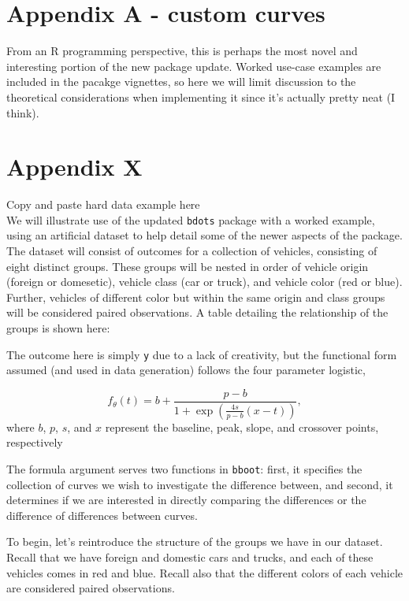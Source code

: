 \documentclass{article}
\newcommand{\xt}{\texttt}%
\begin{document}
\appendix

\section*{Appendix A - custom curves}

From an R programming perspective, this is perhaps the most novel and interesting portion of the new package update. Worked use-case examples are included in the pacakge vignettes, so here we will limit discussion to the theoretical considerations when implementing it since it's actually pretty neat (I think). 



\section*{Appendix X} Copy and paste hard data example here \\

We will illustrate use of the updated \xt{bdots} package with a worked example, using an artificial dataset to help detail some of the newer aspects of the package. The dataset will consist of outcomes for a collection of vehicles, consisting of eight distinct groups. These groups will be nested in order of vehicle origin (foreign or domesetic), vehicle class (car or truck), and vehicle color (red or blue). Further, vehicles of different color but within the same origin and class groups will be considered paired observations. A table detailing the relationship of the groups is shown here:



The outcome here is simply \xt{y} due to a lack of creativity, but the functional form assumed (and used in data generation) follows the four parameter logistic, 

\begin{equation}
f_{\theta}(t) = b + \frac{p-b}{1 + \exp \left( \frac{4s}{p-b} (x-t) \right)},
\end{equation}
where $b$, $p$, $s$, and $x$ represent the baseline, peak, slope, and crossover points, respectively



The formula argument serves two functions in \xt{bboot}: first, it specifies the collection of curves we wish to investigate the difference between, and second, it determines if we are interested in directly comparing the differences or the difference of differences between curves. 

To begin, let's reintroduce the structure of the groups we have in our dataset. Recall that we have foreign and domestic cars and trucks, and each of these vehicles comes in red and blue. Recall also that the different colors of each vehicle are considered paired observations.
\end{document}
